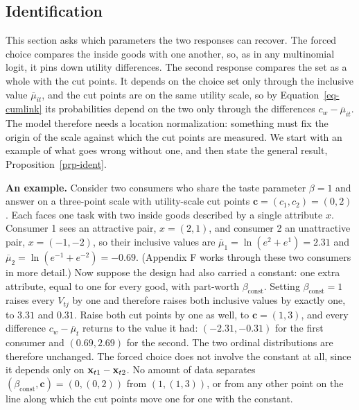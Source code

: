 \documentclass[
  letterpaper,
  DIV=11,
  numbers=noendperiod]{scrartcl}
\theoremstyle{plain}
\theoremstyle{plain}
\theoremstyle{plain}
\theoremstyle{remark}
\begin{document}
\subsection{Identification}\label{sec-identification}

This section asks which parameters the two responses can recover. The
forced choice compares the inside goods with one another, so, as in any
multinomial logit, it pins down utility differences. The second response
compares the set as a whole with the cut points. It depends on the
choice set only through the inclusive value \(\overline{\mu}_{it}\), and
the cut points are on the same utility scale, so by
Equation~\ref{eq-cumlink} its probabilities depend on the two only
through the differences \(c_w - \overline{\mu}_{it}\). The model
therefore needs a location normalization: something must fix the origin
of the scale against which the cut points are measured. We start with an
example of what goes wrong without one, and then state the general
result, Proposition~\ref{prp-ident}.

\textbf{An example.} Consider two consumers who share the taste
parameter \(\beta = 1\) and answer on a three-point scale with
utility-scale cut points \(\mathbf{c} = (c_1, c_2) = (0,2)\). Each faces
one task with two inside goods described by a single attribute \(x\).
Consumer 1 sees an attractive pair, \(x = (2, 1)\), and consumer 2 an
unattractive pair, \(x = (-1, -2)\), so their inclusive values are
\(\overline{\mu}_1 = \ln(e^{2} + e^{1}) = 2.31\) and
\(\overline{\mu}_2 = \ln(e^{-1} + e^{-2}) = -0.69\). (Appendix F works
through these two consumers in more detail.) Now suppose the design had
also carried a constant: one extra attribute, equal to one for every
good, with part-worth \(\beta_{\text{const}}\). Setting
\(\beta_{\text{const}} = 1\) raises every \(V_{tj}\) by one and
therefore raises both inclusive values by exactly one, to \(3.31\) and
\(0.31\). Raise both cut points by one as well, to
\(\mathbf{c} = (1,3)\), and every difference \(c_w - \overline{\mu}_t\)
returns to the value it had: \((-2.31, -0.31)\) for the first consumer
and \((0.69, 2.69)\) for the second. The two ordinal distributions are
therefore unchanged. The forced choice does not involve the constant at
all, since it depends only on \(\mathbf{x}_{t1} - \mathbf{x}_{t2}\). No amount of data
separates
\(\left( \beta_{\text{const}}, \mathbf{c} \right) = \left( 0, (0,2) \right)\)
from \(\left( 1, (1,3) \right)\), or from any other point on the line
along which the cut points move one for one with the constant.
\end{document}
